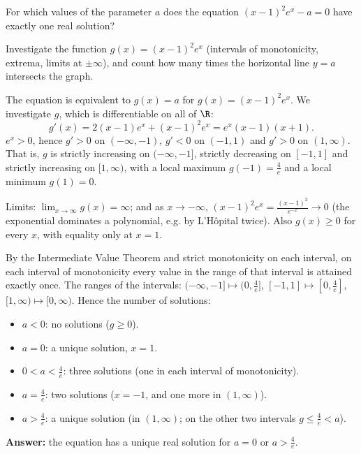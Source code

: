 
\begin{question}
For which values of the parameter $a$ does the equation $(x-1)^2e^x-a=0$ have exactly one real solution?
\end{question}

\begin{hint}
Investigate the function $g(x)=(x-1)^2e^x$ (intervals of monotonicity, extrema, limits at $\pm\infty$), and count how many times the horizontal line $y=a$ intersects the graph.
\end{hint}

\begin{solution}
The equation is equivalent to $g(x)=a$ for $g(x)=(x-1)^2e^x$. We investigate $g$, which is differentiable on all of $\R$:
\[ g'(x)=2(x-1)e^x+(x-1)^2e^x=e^x(x-1)(x+1). \]
$e^x>0$, hence $g'>0$ on $(-\infty,-1)$, $g'<0$ on $(-1,1)$ and $g'>0$ on $(1,\infty)$. That is, $g$ is strictly increasing on $(-\infty,-1]$, strictly decreasing on $[-1,1]$ and strictly increasing on $[1,\infty)$, with a local maximum $g(-1)=\frac{4}{e}$ and a local minimum $g(1)=0$.

Limits: $\lim_{x\to\infty}g(x)=\infty$; and as $x\to-\infty$, $(x-1)^2e^x=\frac{(x-1)^2}{e^{-x}}\to0$ (the exponential dominates a polynomial, e.g. by L'Hôpital twice). Also $g(x)\ge0$ for every $x$, with equality only at $x=1$.

By the Intermediate Value Theorem and strict monotonicity on each interval, on each interval of monotonicity every value in the range of that interval is attained exactly once. The ranges of the intervals: $(-\infty,-1]\mapsto(0,\frac4e]$, $[-1,1]\mapsto[0,\frac4e]$, $[1,\infty)\mapsto[0,\infty)$. Hence the number of solutions:
\begin{itemize}
  \item $a<0$: no solutions ($g\ge0$).
  \item $a=0$: a unique solution, $x=1$.
  \item $0<a<\frac4e$: three solutions (one in each interval of monotonicity).
  \item $a=\frac4e$: two solutions ($x=-1$, and one more in $(1,\infty)$).
  \item $a>\frac4e$: a unique solution (in $(1,\infty)$; on the other two intervals $g\le\frac4e<a$).
\end{itemize}
\textbf{Answer:} the equation has a unique real solution for $\boxed{a=0 \text{ or } a>\frac{4}{e}}$.
\end{solution}
